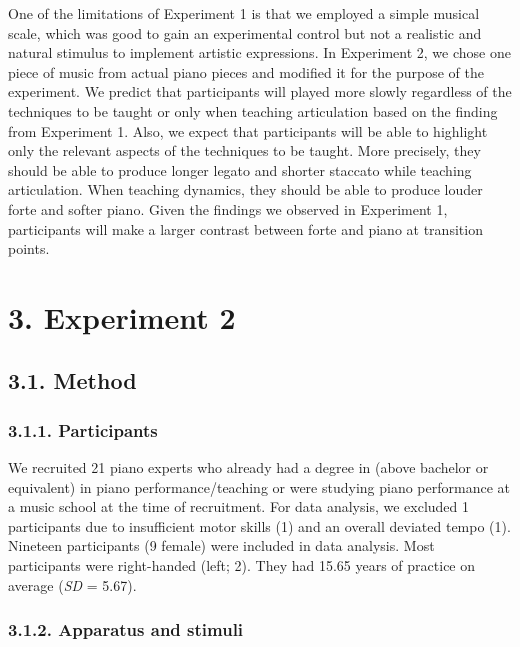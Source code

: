 \documentclass[
  english,
  man,floatsintext]{apa6}
\begin{document}
One of the limitations of Experiment 1 is that we employed a simple musical scale, which was good to gain an experimental control but not a realistic and natural stimulus to implement artistic expressions. In Experiment 2, we chose one piece of music from actual piano pieces and modified it for the purpose of the experiment. We predict that participants will played more slowly regardless of the techniques to be taught or only when teaching articulation based on the finding from Experiment 1. Also, we expect that participants will be able to highlight only the relevant aspects of the techniques to be taught. More precisely, they should be able to produce longer legato and shorter staccato while teaching articulation. When teaching dynamics, they should be able to produce louder forte and softer piano. Given the findings we observed in Experiment 1, participants will make a larger contrast between forte and piano at transition points.

\newpage

\hypertarget{experiment-2}{%
\section{3. Experiment 2}\label{experiment-2}}

\hypertarget{method-1}{%
\subsection{3.1. Method}\label{method-1}}

\hypertarget{participants-1}{%
\subsubsection{3.1.1. Participants}\label{participants-1}}

We recruited 21 piano experts who already had a degree in (above bachelor or equivalent) in piano performance/teaching or were studying piano performance at a music school at the time of recruitment. For data analysis, we excluded 1 participants due to insufficient motor skills (1) and an overall deviated tempo (1). Nineteen participants (9 female) were included in data analysis. Most participants were right-handed (left; 2). They had 15.65 years of practice on average (\emph{SD} = 5.67).

\hypertarget{apparatus-and-stimuli-1}{%
\subsubsection{3.1.2. Apparatus and stimuli}\label{apparatus-and-stimuli-1}}
\end{document}
